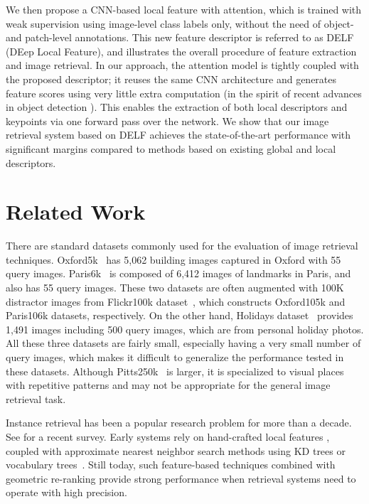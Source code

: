 \documentclass[10pt,twocolumn,letterpaper]{article}
\begin{document}
We then propose a CNN-based local feature with attention, which is trained with weak supervision using image-level class labels only, without the need of object- and patch-level annotations.
This new feature descriptor is referred to as DELF (DEep Local Feature), and  illustrates the overall procedure of feature extraction and image retrieval.
In our approach, the attention model is tightly coupled with the proposed descriptor; it reuses the same CNN architecture and generates feature scores using very little extra computation (in the spirit of recent advances in object detection \cite{ren2015faster}).
This enables the extraction of both local descriptors and keypoints via one forward pass over the network.
We show that our image retrieval system based on DELF achieves the state-of-the-art performance with significant margins compared to methods based on existing global and local descriptors.












 

\section{Related Work}

There are standard datasets commonly used for the evaluation of image retrieval techniques.
Oxford5k~\cite{Philbin07} has 5,062 building images captured in Oxford with 55 query images.
Paris6k~\cite{Philbin2008} is composed of 6,412 images of landmarks in Paris, and also has 55 query images.
These two datasets are often augmented with 100K distractor images from Flickr100k dataset~\cite{Philbin07}, which constructs Oxford105k and Paris106k datasets, respectively.
On the other hand, Holidays dataset~\cite{Jegou2008} provides 1,491 images including 500 query images, which are from personal holiday photos.
All these three datasets are fairly small, especially having a very small number of query images, which makes it difficult to generalize the performance tested in these datasets.
Although Pitts250k~\cite{torii13visual} is larger, it is specialized to visual places with repetitive patterns and may not be appropriate for the general image retrieval task.

Instance retrieval has been a popular research problem for more than a decade.
See \cite{zheng2016sift} for a recent survey.
Early systems rely on hand-crafted local features \cite{Lowe2004,bay2008speeded,buddemeier2012systems}, coupled with approximate nearest neighbor search methods using KD trees or vocabulary trees~\cite{beis1997shape,Nister}.
Still today, such feature-based techniques combined with geometric re-ranking provide strong performance when retrieval systems need to operate with high precision.
\end{document}

